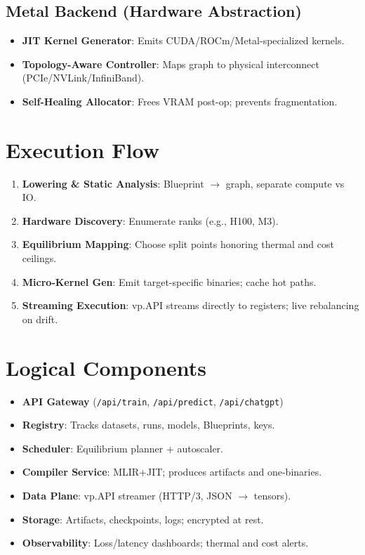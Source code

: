 \documentclass[11pt]{article}
\begin{document}
\subsection{Metal Backend (Hardware Abstraction)}
\begin{itemize}
  \item \textbf{JIT Kernel Generator}: Emits CUDA/ROCm/Metal-specialized kernels.
  \item \textbf{Topology-Aware Controller}: Maps graph to physical interconnect (PCIe/NVLink/InfiniBand).
  \item \textbf{Self-Healing Allocator}: Frees VRAM post-op; prevents fragmentation.
\end{itemize}

\section{Execution Flow}
\begin{enumerate}
  \item \textbf{Lowering \& Static Analysis}: Blueprint $\rightarrow$ graph, separate compute vs IO.
  \item \textbf{Hardware Discovery}: Enumerate ranks (e.g., H100, M3).
  \item \textbf{Equilibrium Mapping}: Choose split points honoring thermal and cost ceilings.
  \item \textbf{Micro-Kernel Gen}: Emit target-specific binaries; cache hot paths.
  \item \textbf{Streaming Execution}: vp.API streams directly to registers; live rebalancing on drift.
\end{enumerate}

\section{Logical Components}
\begin{itemize}
  \item \textbf{API Gateway} (\texttt{/api/train}, \texttt{/api/predict}, \texttt{/api/chatgpt})
  \item \textbf{Registry}: Tracks datasets, runs, models, Blueprints, keys.
  \item \textbf{Scheduler}: Equilibrium planner + autoscaler.
  \item \textbf{Compiler Service}: MLIR+JIT; produces artifacts and one-binaries.
  \item \textbf{Data Plane}: vp.API streamer (HTTP/3, JSON $\rightarrow$ tensors).
  \item \textbf{Storage}: Artifacts, checkpoints, logs; encrypted at rest.
  \item \textbf{Observability}: Loss/latency dashboards; thermal and cost alerts.
\end{itemize}
\end{document}
